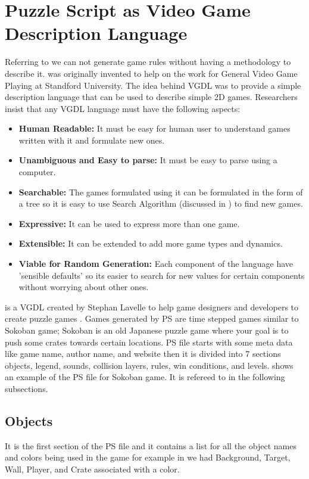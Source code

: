 \section{Puzzle Script as Video Game Description Language}
Referring to  we can not generate game rules without having a methodology to describe it.  was originally invented to help on the work for General Video Game Playing at Standford University. The idea behind VGDL was to provide a simple description language that can be used to describe simple 2D games. Researchers insist that any VGDL language must have the following aspects:\cite{vgdl}
\begin{itemize}\itemsep0pt \parskip0pt 
	\item \textbf{Human Readable:} It must be easy for human user to understand games written with it and formulate new ones.
	\item \textbf{Unambiguous and Easy to parse:} It must be easy to parse using a computer.
	\item \textbf{Searchable:} The games formulated using it can be formulated in the form of a tree so it is easy to use Search Algorithm (discussed in ) to find new games.
	\item \textbf{Expressive:} It can be used to express more than one game.
	\item \textbf{Extensible:} It can be extended to add more game types and dynamics.
	\item \textbf{Viable for Random Generation:} Each component of the language have 'sensible defaults' so its easier to search for new values for certain components without worrying about other ones.
\end{itemize}

 is a VGDL created by Stephan Lavelle to help game designers and developers to create puzzle games \cite{puzzleScript}. Games generated by PS are time stepped games similar to Sokoban game; Sokoban is an old Japanese puzzle game where your goal is to push some crates towards certain locations\cite{sokoban}. PS file starts with some meta data like game name, author name, and website then it is divided into 7 sections objects, legend, sounds, collision layers, rules, win conditions, and levels.  shows an example of the PS file for Sokoban game. It is refereed to in the following subsections.

\subsection{Objects}
It is the first section of the PS file and it contains a list for all the object names and colors being used in the game for example in  we had Background, Target, Wall, Player, and Crate associated with a color.

